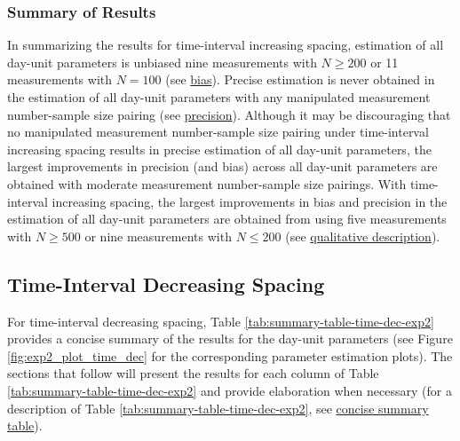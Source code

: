 \documentclass[
12pt, %
twoside,
english]{guelphthesis}
\theoremstyle{definition}
\theoremstyle{definition}
\theoremstyle{definition}
\theoremstyle{definition}
\theoremstyle{remark}
\begin{document}
\hypertarget{summary-of-results-5}{%
\subsubsection{Summary of Results}\label{summary-of-results-5}}

In summarizing the results for time-interval increasing spacing, estimation of all day-unit parameters is unbiased nine measurements with \(N \ge 200\) or 11 measurements with \(N = 100\) (see \protect\hyperlink{bias-time-inc-exp2}{bias}). Precise estimation is never obtained in the estimation of all day-unit parameters with any manipulated measurement number-sample size pairing (see \protect\hyperlink{precision-time-inc-exp2}{precision}). Although it may be discouraging that no manipulated measurement number-sample size pairing under time-interval increasing spacing results in precise estimation of all day-unit parameters, the largest improvements in precision (and bias) across all day-unit parameters are obtained with moderate measurement number-sample size pairings. With time-interval increasing spacing, the largest improvements in bias and precision in the estimation of all day-unit parameters are obtained from using five measurements with \(N \ge 500\) or nine measurements with \(N \le 200\) (see \protect\hyperlink{qualitative-time-inc-exp2}{qualitative description}).

\hypertarget{time-interval-decreasing-spacing-1}{%
\subsection{Time-Interval Decreasing Spacing}\label{time-interval-decreasing-spacing-1}}

For time-interval decreasing spacing, Table \ref{tab:summary-table-time-dec-exp2} provides a concise summary of the results for the day-unit parameters (see Figure \ref{fig:exp2_plot_time_dec} for the corresponding parameter estimation plots). The sections that follow will present the results for each column of Table \ref{tab:summary-table-time-dec-exp2} and provide elaboration when necessary (for a description of Table \ref{tab:summary-table-time-dec-exp2}, see \protect\hyperlink{concise-example}{concise summary table}).
\end{document}
